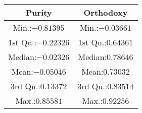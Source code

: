 \begin{tabular}{cc}
	\addlinespace
	\toprule
	Purity&Orthodoxy\\
	\midrule
	Min.:$-0.81395$&Min.:$-0.03661$\\
	1st Qu.:$-0.22326$&1st Qu.:$0.64361$\\
	Median:$-0.02326$&Median:$0.78646$\\
	Mean:$-0.05046$&Mean:$0.73032$\\
	3rd Qu.:$0.13372$&3rd Qu.:$0.83514$\\
	Max.:$0.85581$&Max.:$0.92256$\\
	\bottomrule
\end{tabular}
